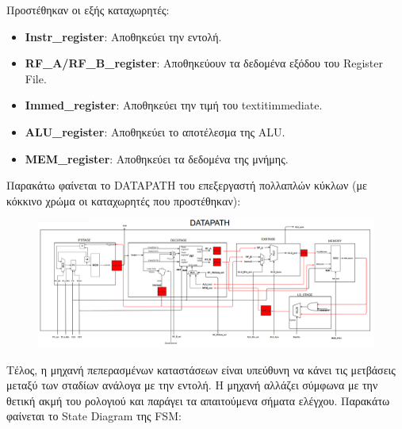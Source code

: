 \begin{justify}
    Προστέθηκαν οι εξής καταχωρητές:
\end{justify}

\begin{itemize}[label=\textbullet]
    \item {\bf \textlatin{Instr\_register}}: Αποθηκεύει την εντολή.
    \item {\bf \textlatin{RF\_A/RF\_B\_register}}: Αποθηκεύουν τα δεδομένα εξόδου
    του \textlatin{Register File}.
    \item {\bf \textlatin{Immed\_register}}: Αποθηκεύει την τιμή του
    \textlatin{textit{immediate}}.
    \item  {\bf \textlatin{ALU\_register}}: Αποθηκεύει το αποτέλεσμα της
    \textlatin{ALU}.
    \item  {\bf \textlatin{MEM\_register}}: Αποθηκεύει τα δεδομένα της μνήμης.
\end{itemize}


\vspace{1cm}

\begin{justify}
    Παρακάτω φαίνεται το \textlatin{DATAPATH} του επεξεργαστή 
    πολλαπλών κύκλων (με κόκκινο χρώμα οι καταχωρητές που
    προστέθηκαν): 
\end{justify}




\begin{figure}[h]
    \centering
    \includegraphics[width=1.1\textwidth]{IMAGES/datapath.png} %
\end{figure}

\newpage

\begin{justify}
    Τέλος, η μηχανή πεπερασμένων καταστάσεων είναι υπεύθυνη να κάνει
    τις μετβάσεις μεταξύ των σταδίων ανάλογα με την εντολή. Η μηχανή
    αλλάζει σύμφωνα με την θετική ακμή του ρολογιού και παράγει τα απαιτούμενα
    σήματα ελέγχου. Παρακάτω φαίνεται το \textlatin{State Diagram} της 
    \textlatin{FSM}:
\end{justify}



